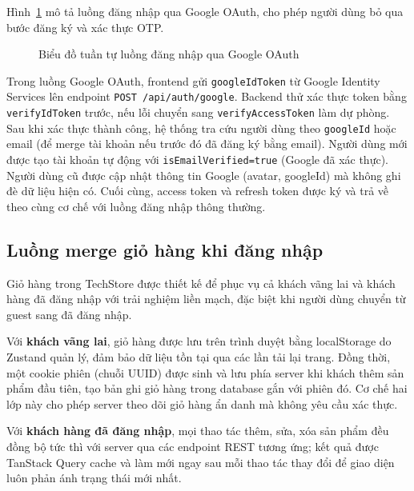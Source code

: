 \clearpage
Hình~\ref{fig:seq_auth_oauth} mô tả luồng đăng nhập qua Google OAuth, cho phép người dùng bỏ qua bước đăng ký và xác thực OTP.

\begin{figure}[H]
  \centering
  \caption{Biểu đồ tuần tự luồng đăng nhập qua Google OAuth}
  \label{fig:seq_auth_oauth}
\end{figure}

Trong luồng Google OAuth, frontend gửi \texttt{googleIdToken} từ Google Identity Services lên endpoint \texttt{POST /api/auth/google}. Backend thử xác thực token bằng \texttt{verifyIdToken} trước, nếu lỗi chuyển sang \texttt{verifyAccessToken} làm dự phòng. Sau khi xác thực thành công, hệ thống tra cứu người dùng theo \texttt{googleId} hoặc email (để merge tài khoản nếu trước đó đã đăng ký bằng email). Người dùng mới được tạo tài khoản tự động với \texttt{isEmailVerified=true} (Google đã xác thực). Người dùng cũ được cập nhật thông tin Google (avatar, googleId) mà không ghi đè dữ liệu hiện có. Cuối cùng, access token và refresh token được ký và trả về theo cùng cơ chế với luồng đăng nhập thông thường.

\subsection{Luồng merge giỏ hàng khi đăng nhập}
\label{sec:c3_cart_flow}

Giỏ hàng trong TechStore được thiết kế để phục vụ cả khách vãng lai và khách hàng đã đăng nhập với trải nghiệm liền mạch, đặc biệt khi người dùng chuyển từ guest sang đã đăng nhập.

Với \textbf{khách vãng lai}, giỏ hàng được lưu trên trình duyệt bằng localStorage do Zustand quản lý, đảm bảo dữ liệu tồn tại qua các lần tải lại trang. Đồng thời, một cookie phiên (chuỗi UUID) được sinh và lưu phía server khi khách thêm sản phẩm đầu tiên, tạo bản ghi giỏ hàng trong database gắn với phiên đó. Cơ chế hai lớp này cho phép server theo dõi giỏ hàng ẩn danh mà không yêu cầu xác thực.

Với \textbf{khách hàng đã đăng nhập}, mọi thao tác thêm, sửa, xóa sản phẩm đều đồng bộ tức thì với server qua các endpoint REST tương ứng; kết quả được TanStack Query cache và làm mới ngay sau mỗi thao tác thay đổi để giao diện luôn phản ánh trạng thái mới nhất.

